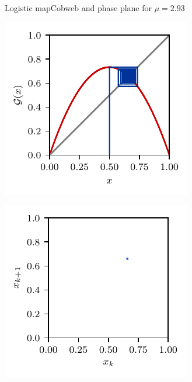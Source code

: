\documentclass[usenames,dvipsnames,svgnames,10pt,aspectratio=169]{beamer}
\begin{document}
\begin{frame}[t, c]{Logistic map}{Cobweb and phase plane for $\mu = 2.93$}
	\begin{minipage}{.48\textwidth}
		\centering
		\includegraphics[width=.75\textwidth]{logistic_map_cobweb_plot_6}
	\end{minipage}%
	\begin{minipage}{.48\textwidth}
		\centering
		\includegraphics[width=.75\textwidth]{logistic_map_phase_plane_6}
	\end{minipage}

	\vspace{1cm}
\end{frame}
\end{document}
